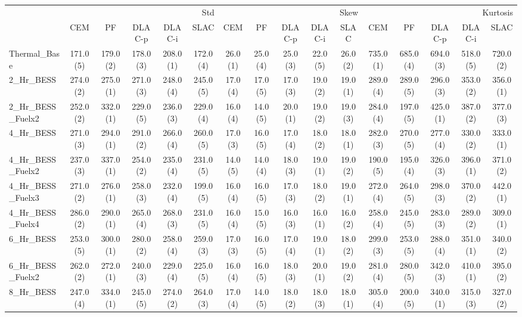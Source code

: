 \begin{tabular}{lccccccccccccccc}
\toprule
 & \multicolumn{5}{r}{Std} & \multicolumn{5}{r}{Skew} & \multicolumn{5}{r}{Kurtosis} \\
 & CEM & PF & DLAC-p & DLAC-i & SLAC & CEM & PF & DLAC-p & DLAC-i & SLAC & CEM & PF & DLAC-p & DLAC-i & SLAC \\
\midrule
Thermal_Base & 171.0 (5) & 179.0 (2) & 178.0 (3) & 208.0 (1) & 172.0 (4) & 26.0 (1) & 25.0 (4) & 25.0 (3) & 22.0 (5) & 26.0 (2) & 735.0 (1) & 685.0 (4) & 694.0 (3) & 518.0 (5) & 720.0 (2) \\
2_Hr_BESS & 274.0 (2) & 275.0 (1) & 271.0 (3) & 248.0 (4) & 245.0 (5) & 17.0 (4) & 17.0 (5) & 17.0 (3) & 19.0 (2) & 19.0 (1) & 289.0 (4) & 289.0 (5) & 296.0 (3) & 353.0 (2) & 356.0 (1) \\
2_Hr_BESS_Fuelx2 & 252.0 (2) & 332.0 (1) & 229.0 (5) & 236.0 (3) & 229.0 (4) & 16.0 (4) & 14.0 (5) & 20.0 (1) & 19.0 (2) & 19.0 (3) & 284.0 (4) & 197.0 (5) & 425.0 (1) & 387.0 (2) & 377.0 (3) \\
4_Hr_BESS & 271.0 (3) & 294.0 (1) & 291.0 (2) & 266.0 (4) & 260.0 (5) & 17.0 (3) & 16.0 (5) & 17.0 (4) & 18.0 (2) & 18.0 (1) & 282.0 (3) & 270.0 (5) & 277.0 (4) & 330.0 (2) & 333.0 (1) \\
4_Hr_BESS_Fuelx2 & 237.0 (3) & 337.0 (1) & 254.0 (2) & 235.0 (4) & 231.0 (5) & 14.0 (5) & 14.0 (4) & 18.0 (3) & 19.0 (1) & 19.0 (2) & 190.0 (5) & 195.0 (4) & 326.0 (3) & 396.0 (1) & 371.0 (2) \\
4_Hr_BESS_Fuelx3 & 271.0 (2) & 276.0 (1) & 258.0 (3) & 232.0 (4) & 199.0 (5) & 16.0 (4) & 16.0 (5) & 17.0 (3) & 18.0 (2) & 19.0 (1) & 272.0 (4) & 264.0 (5) & 298.0 (3) & 370.0 (2) & 442.0 (1) \\
4_Hr_BESS_Fuelx4 & 286.0 (2) & 290.0 (1) & 265.0 (4) & 268.0 (3) & 231.0 (5) & 16.0 (4) & 15.0 (5) & 16.0 (3) & 16.0 (1) & 16.0 (2) & 258.0 (4) & 245.0 (5) & 283.0 (3) & 289.0 (2) & 309.0 (1) \\
6_Hr_BESS & 253.0 (5) & 300.0 (1) & 280.0 (2) & 258.0 (4) & 259.0 (3) & 17.0 (3) & 16.0 (5) & 17.0 (4) & 19.0 (1) & 18.0 (2) & 299.0 (3) & 253.0 (5) & 288.0 (4) & 351.0 (1) & 340.0 (2) \\
6_Hr_BESS_Fuelx2 & 262.0 (2) & 272.0 (1) & 240.0 (3) & 229.0 (4) & 225.0 (5) & 16.0 (4) & 16.0 (5) & 18.0 (3) & 20.0 (1) & 19.0 (2) & 281.0 (4) & 280.0 (5) & 342.0 (3) & 410.0 (1) & 395.0 (2) \\
8_Hr_BESS & 247.0 (4) & 334.0 (1) & 245.0 (5) & 274.0 (2) & 264.0 (3) & 17.0 (4) & 14.0 (5) & 18.0 (2) & 18.0 (3) & 18.0 (1) & 305.0 (4) & 200.0 (5) & 340.0 (1) & 315.0 (3) & 327.0 (2) \\

\end{tabular}
